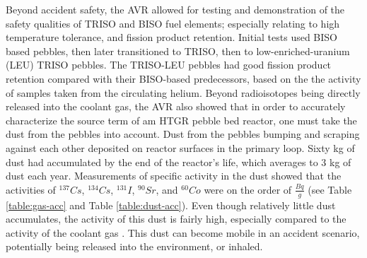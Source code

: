 Beyond accident safety, the AVR allowed for testing and demonstration of the safety qualities of TRISO and BISO fuel elements; especially relating to high temperature tolerance, and fission product retention.  Initial tests used BISO based pebbles, then later transitioned to TRISO, then to low-enriched-uranium (LEU) TRISO pebbles.  The TRISO-LEU pebbles had good fission product retention compared with their BISO-based predecessors, based on the the activity of samples taken from the circulating helium.  Beyond radioisotopes being directly released into the coolant gas, the AVR also showed that in order to accurately characterize the source term of am HTGR pebble bed reactor, one must take the dust from the pebbles into account.  Dust from the pebbles bumping and scraping against each other deposited on reactor surfaces in the primary loop.  Sixty kg of dust had accumulated by the end of the reactor's life, which averages to 3 kg of dust each year.  Measurements of specific activity in the dust showed that the activities of $^{137}Cs$, $^{134}Cs$, $^{131}I$, $^{90}Sr$, and $^{60}Co$ were on the order of $\frac{Bq}{g}$ (see Table \ref{table:gas-acc} and Table \ref{table:dust-acc}).  Even though relatively little dust accumulates, the activity of this dust is fairly high, especially compared to the activity of the coolant gas \cite{noauthor_results_1990}.  This dust can become mobile in an accident scenario, potentially being released into the environment, or inhaled.


